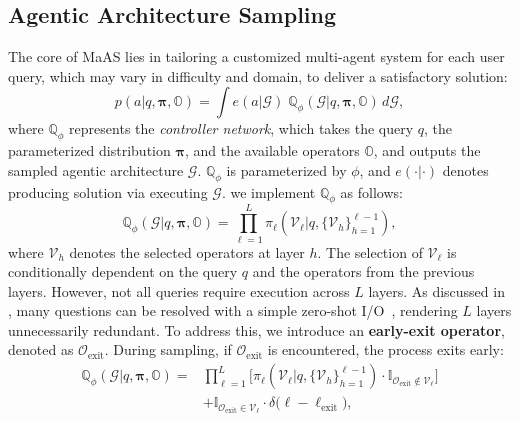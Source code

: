 \documentclass{article}
\theoremstyle{plain}
\theoremstyle{definition}
\theoremstyle{remark}
\newcommand{\ourmethod}{{{MaAS}}\xspace}
\begin{document}
\vspace{-0.5em}
\subsection{Agentic Architecture Sampling}\label{sec:arch-sample}
\vspace{-0.5em}
The core of \ourmethod lies in tailoring a customized multi-agent system for each user query, which may vary in difficulty and domain, to deliver a satisfactory solution:  
\begin{equation}\label{eq:core}
p(a | q, \boldsymbol{\pi}, \mathbb{O}) = \int e(a | \mathcal{G}) \; \mathbb{Q}_\phi(\mathcal{G} | q, \boldsymbol{\pi}, \mathbb{O}) \, d\mathcal{G},  
\end{equation}  
where $\mathbb{Q}_\phi$ represents the \textit{controller network}, which takes the query $q$, the parameterized distribution $\boldsymbol{\pi}$, and the  available operators $\mathbb{O}$, and outputs the sampled agentic architecture $\mathcal{G}$. $\mathbb{Q}_\phi$ is parameterized by $\phi$, and $e(\cdot|\cdot)$ denotes producing solution via executing $\mathcal{G}$. we implement $\mathbb{Q}_\phi$ as follows:
\begin{equation}
\mathbb{Q}_\phi(\mathcal{G} | q, \boldsymbol{\pi}, \mathbb{O}) = \prod_{\ell=1}^L \pi_\ell(\mathcal{V}_\ell | q, \{\mathcal{V}_h\}_{h=1}^{\ell-1}),
\end{equation}
where $\mathcal{V}_h$ denotes the selected operators at layer $h$. The selection of $\mathcal{V}_\ell$ is conditionally dependent on the query \( q \) and the operators from the previous layers. However, not all queries require execution across \( L \) layers. As discussed in , many questions can be resolved with a simple zero-shot I/O~\citep{zhang2024gdesigner}, rendering \( L \) layers unnecessarily redundant. To address this, we introduce an \textbf{early-exit operator}, denoted as \(\mathcal{O}_\text{exit}\). During sampling, if \(\mathcal{O}_\text{exit}\) is encountered, the process exits early:  
\begin{equation}  \label{eq:early-exit}
\begin{aligned}  
\mathbb{Q}_\phi(\mathcal{G} | q, \boldsymbol{\pi}, \mathbb{O}) =& \prod_{\ell=1}^{L} \Big[ \pi_\ell(\mathcal{V}_\ell | q, \{\mathcal{V}_h\}_{h=1}^{\ell-1}) \cdot \mathbb{I}_{\mathcal{O}_{\text{exit}} \notin \mathcal{V}_\ell} \Big] \\ 
&+ \mathbb{I}_{\mathcal{O}_{\text{exit}} \in \mathcal{V}_\ell} \cdot \delta\Big(\ell - \ell_{\text{exit}}\Big),  
\end{aligned}  
\end{equation}  
\end{document}
